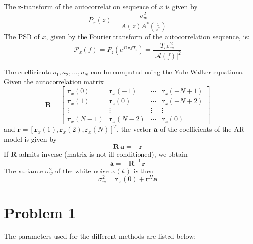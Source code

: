 \documentclass[a4paper, 12pt]{report}
\begin{document}
The z-transform of the autocorrelation sequence of $x$ is given by
\begin{equation}
	P_x(z) = \frac{\sigma_w^2}{A(z) A^{*} \left( \frac{1}{z^{*}} \right) }
\end{equation}
The PSD of $x$, given by the Fourier transform of the autocorrelation sequence, is:
\begin{equation}
	\mathcal{P}_x(f) = P_z(e^{j 2 \pi f T_c})= \frac{T_c \sigma_w^2}{|\mathcal{A}(f)|^2}
\end{equation}

The coefficients $a_1, a_2, ..., a_N$ can be computed using the Yule-Walker equations. Given the autocorrelation matrix
\begin{equation}
\mathbf{R} =
\begin{bmatrix}
\mathtt{r}_x(0)		&	\mathtt{r}_x(-1) 	& \cdots &	\mathtt{r}_x(-N+1) \\
\mathtt{r}_x(1)		&	\mathtt{r}_z(0)  	& \cdots &	\mathtt{r}_x(-N+2) \\
\vdots				&	\vdots        		& \vdots &	\vdots \\
\mathtt{r}_x(N-1)	&	\mathtt{r}_x(N-2)	& \cdots &	\mathtt{r}_x(0)
\end{bmatrix}
\end{equation}
and $ \mathbf{r} = [\mathtt{r}_x(1),  \mathtt{r}_x(2),  \mathtt{r}_x(N)]^T $, the vector $\mathbf{a}$ of the coefficients of the AR model is given by
\begin{equation}\label{eq:yulewalker}
	\mathbf{R} \, \mathbf{a} = - \mathbf{r}
\end{equation}
If $\mathbf{R}$ admits inverse (matrix is not ill conditioned), we obtain
\begin{equation}
	\mathbf{a} = -\mathbf{R}^{-1} \, \mathbf{r}
\end{equation}
The variance $\sigma_w ^2$ of the white noise $w(k)$ is then
\begin{equation}
	\sigma_w ^2 = \mathtt{r}_x(0) + \mathbf{r}^H \mathbf{a}
\end{equation}


\section*{Problem 1}

The parameters used for the different methods are listed below:
\end{document}
